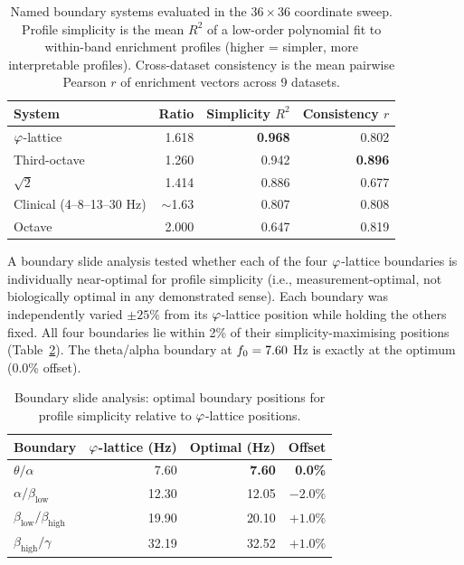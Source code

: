 \begin{table}[h]
\centering
\caption{Named boundary systems evaluated in the $36 \times 36$ coordinate sweep.
Profile simplicity is the mean $R^2$ of a low-order polynomial fit to within-band enrichment profiles (higher = simpler, more interpretable profiles). Cross-dataset consistency is the mean pairwise Pearson $r$ of enrichment vectors across 9 datasets.}
\label{tab:boundary_sweep}
\begin{tabular}{l r r r}
\toprule
System & Ratio & Simplicity $R^2$ & Consistency $r$ \\
\midrule
$\varphi$-lattice  & 1.618 & \textbf{0.968} & 0.802 \\
Third-octave       & 1.260 & 0.942          & \textbf{0.896} \\
$\sqrt{2}$         & 1.414 & 0.886          & 0.677 \\
Clinical (4--8--13--30 Hz) & $\sim$1.63 & 0.807 & 0.808 \\
Octave             & 2.000 & 0.647          & 0.819 \\
\bottomrule
\end{tabular}
\end{table}

A boundary slide analysis tested whether each of the four $\varphi$-lattice boundaries is individually near-optimal for profile simplicity (i.e., measurement-optimal, not biologically optimal in any demonstrated sense). Each boundary was independently varied $\pm 25\%$ from its $\varphi$-lattice position while holding the others fixed. All four boundaries lie within 2\% of their simplicity-maximising positions (Table~\ref{tab:boundary_slide}). The theta/alpha boundary at $f_0 = 7.60$ Hz is exactly at the optimum (0.0\% offset).

\begin{table}[h]
\centering
\caption{Boundary slide analysis: optimal boundary positions for profile simplicity relative to $\varphi$-lattice positions.}
\label{tab:boundary_slide}
\begin{tabular}{l r r r}
\toprule
Boundary & $\varphi$-lattice (Hz) & Optimal (Hz) & Offset \\
\midrule
$\theta / \alpha$              & 7.60  & \textbf{7.60}  & \textbf{0.0\%} \\
$\alpha / \beta_{\text{low}}$  & 12.30 & 12.05          & $-2.0\%$ \\
$\beta_{\text{low}} / \beta_{\text{high}}$ & 19.90 & 20.10 & $+1.0\%$ \\
$\beta_{\text{high}} / \gamma$ & 32.19 & 32.52          & $+1.0\%$ \\
\bottomrule
\end{tabular}
\end{table}

